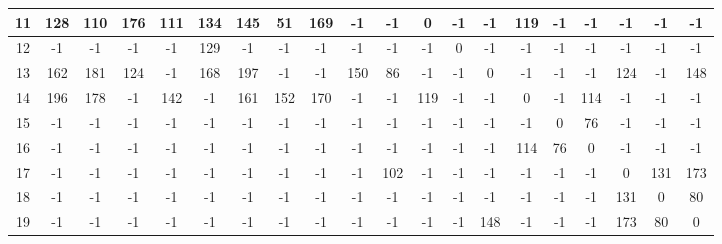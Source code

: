 \documentclass[UTF8,12pt]{ctexart}
\begin{document}
\begin{enumerate}
\begin{itemize}
\begin{table}[H]
{\begin{scriptsize}
\begin{tabular}{cccccccccccccccccccc}
                                    \midrule
                                    11   & 128 & 110 & 176 & 111 & 134 & 145 & 51  & 169 & -1  & -1  & 0   & -1  & -1  & 119 & -1 & -1  & -1  & -1  & -1  \\
                                    \midrule
                                    12   & -1  & -1  & -1  & -1  & 129 & -1  & -1  & -1  & -1  & -1  & -1  & 0   & -1  & -1  & -1 & -1  & -1  & -1  & -1  \\
                                    \midrule
                                    13   & 162 & 181 & 124 & -1  & 168 & 197 & -1  & -1  & 150 & 86  & -1  & -1  & 0   & -1  & -1 & -1  & 124 & -1  & 148 \\
                                    \midrule
                                    14   & 196 & 178 & -1  & 142 & -1  & 161 & 152 & 170 & -1  & -1  & 119 & -1  & -1  & 0   & -1 & 114 & -1  & -1  & -1  \\
                                    \midrule
                                    15   & -1  & -1  & -1  & -1  & -1  & -1  & -1  & -1  & -1  & -1  & -1  & -1  & -1  & -1  & 0  & 76  & -1  & -1  & -1  \\
                                    \midrule
                                    16   & -1  & -1  & -1  & -1  & -1  & -1  & -1  & -1  & -1  & -1  & -1  & -1  & -1  & 114 & 76 & 0   & -1  & -1  & -1  \\
                                    \midrule
                                    17   & -1  & -1  & -1  & -1  & -1  & -1  & -1  & -1  & -1  & 102 & -1  & -1  & -1  & -1  & -1 & -1  & 0   & 131 & 173 \\
                                    \midrule
                                    18   & -1  & -1  & -1  & -1  & -1  & -1  & -1  & -1  & -1  & -1  & -1  & -1  & -1  & -1  & -1 & -1  & 131 & 0   & 80  \\
                                    \midrule
                                    19   & -1  & -1  & -1  & -1  & -1  & -1  & -1  & -1  & -1  & -1  & -1  & -1  & 148 & -1  & -1 & -1  & 173 & 80  & 0   \\
                                    \bottomrule
                                \end{tabular}

                            \end{scriptsize}
                        }
                    \end{table}


\end{itemize}
\end{enumerate}
\end{document}
